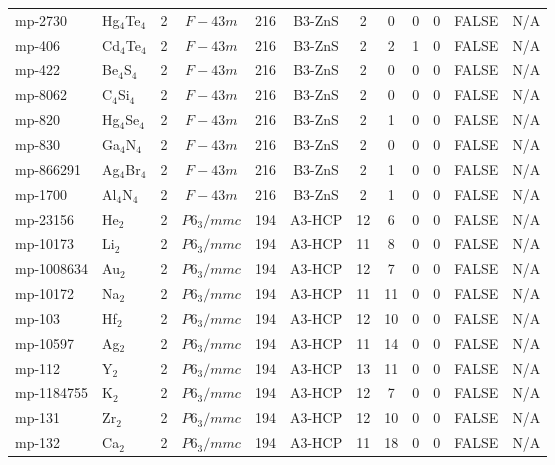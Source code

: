 {\begin{longtable}{llcccccccccc}
    mp-2730 & Hg$_{4}$Te$_{4}$ & 2     & $F-43m$ & 216   & B3-ZnS & 2     & 0     & 0     & 0     & FALSE & N/A \\
    mp-406 & Cd$_{4}$Te$_{4}$ & 2     & $F-43m$ & 216   & B3-ZnS & 2     & 2     & 1     & 0     & FALSE & N/A \\
    mp-422 & Be$_{4}$S$_{4}$ & 2     & $F-43m$ & 216   & B3-ZnS & 2     & 0     & 0     & 0     & FALSE & N/A \\
    mp-8062 & C$_{4}$Si$_{4}$ & 2     & $F-43m$ & 216   & B3-ZnS & 2     & 0     & 0     & 0     & FALSE & N/A \\
    mp-820 & Hg$_{4}$Se$_{4}$ & 2     & $F-43m$ & 216   & B3-ZnS & 2     & 1     & 0     & 0     & FALSE & N/A \\
    mp-830 & Ga$_{4}$N$_{4}$ & 2     & $F-43m$ & 216   & B3-ZnS & 2     & 0     & 0     & 0     & FALSE & N/A \\
    mp-866291 & Ag$_{4}$Br$_{4}$ & 2     & $F-43m$ & 216   & B3-ZnS & 2     & 1     & 0     & 0     & FALSE & N/A \\
    mp-1700 & Al$_{4}$N$_{4}$ & 2     & $F-43m$ & 216   & B3-ZnS & 2     & 1     & 0     & 0     & FALSE & N/A \\
    mp-23156 & He$_{2}$ & 2     & $P6_3/mmc$ & 194   & A3-HCP & 12    & 6     & 0     & 0     & FALSE & N/A \\
    mp-10173 & Li$_{2}$ & 2     & $P6_3/mmc$ & 194   & A3-HCP & 11    & 8     & 0     & 0     & FALSE & N/A \\
    mp-1008634 & Au$_{2}$ & 2     & $P6_3/mmc$ & 194   & A3-HCP & 12    & 7     & 0     & 0     & FALSE & N/A \\
    mp-10172 & Na$_{2}$ & 2     & $P6_3/mmc$ & 194   & A3-HCP & 11    & 11    & 0     & 0     & FALSE & N/A \\
    mp-103 & Hf$_{2}$ & 2     & $P6_3/mmc$ & 194   & A3-HCP & 12    & 10    & 0     & 0     & FALSE & N/A \\
    mp-10597 & Ag$_{2}$ & 2     & $P6_3/mmc$ & 194   & A3-HCP & 11    & 14    & 0     & 0     & FALSE & N/A \\
    mp-112 & Y$_{2}$ & 2     & $P6_3/mmc$ & 194   & A3-HCP & 13    & 11    & 0     & 0     & FALSE & N/A \\
    mp-1184755 & K$_{2}$ & 2     & $P6_3/mmc$ & 194   & A3-HCP & 12    & 7     & 0     & 0     & FALSE & N/A \\
    mp-131 & Zr$_{2}$ & 2     & $P6_3/mmc$ & 194   & A3-HCP & 12    & 10    & 0     & 0     & FALSE & N/A \\
    mp-132 & Ca$_{2}$ & 2     & $P6_3/mmc$ & 194   & A3-HCP & 11    & 18    & 0     & 0     & FALSE & N/A \\

\end{longtable}}
